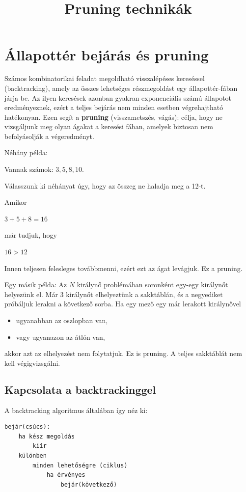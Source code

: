 \documentclass[12pt,a4paper]{article}
\title{Pruning technikák}
\date{}
\begin{document}
\maketitle

\section*{Állapottér bejárás és pruning}

Számos kombinatorikai feladat megoldható visszalépéses kereséssel (backtracking), amely az összes lehetséges részmegoldást egy állapottér-fában járja be. Az ilyen keresések azonban gyakran exponenciális számú állapotot eredményeznek, ezért a teljes bejárás nem minden esetben végrehajtható hatékonyan. Ezen segít a \textbf{pruning} (visszametszés, vágás): célja, hogy ne vizsgáljunk meg olyan ágakat a keresési fában, amelyek biztosan nem befolyásolják a végeredményt.

Néhány példa:

Vannak számok: $3, 5, 8, 10$.

Válasszunk ki néhányat úgy, hogy az összeg ne haladja meg a 12-t.

Amikor

$3 + 5 + 8 = 16$

már tudjuk, hogy

$16 > 12$

Innen teljesen felesleges továbbmenni, ezért ezt az ágat levágjuk. Ez a pruning.

Egy másik példa:
Az $N$ királynő problémában soronként egy-egy királynőt helyezünk el. Már 3 királynőt elhelyeztünk a sakktáblán, és a negyediket próbáljuk lerakni a következő sorba. Ha egy mező egy már lerakott királynővel

\begin{itemize}
    \item ugyanabban az oszlopban van,
    \item vagy ugyanazon az átlón van,
\end{itemize}

akkor azt az elhelyezést nem folytatjuk. Ez is pruning. A teljes sakktáblát nem kell végigvizsgálni.

\subsection*{Kapcsolata a backtrackinggel}
A backtracking algoritmus általában így néz ki:
\begin{verbatim}
bejár(csúcs):
    ha kész megoldás
        kiír
    különben
        minden lehetőségre (ciklus)
            ha érvényes
                bejár(következő)
\end{verbatim}
\end{document}
